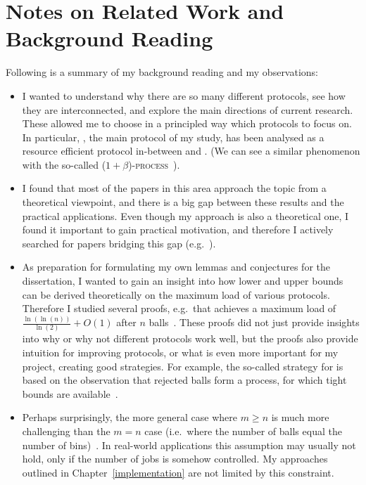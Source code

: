 
\chapter{Notes on Related Work and Background Reading}\label{related-work} 

Following is a summary of my background reading and my observations:


\begin{itemize}
    \item 
    I wanted to understand why there are so many different protocols, see how they are interconnected, and explore the main directions of current research. These allowed me to choose in a principled way which protocols to focus on. In particular, \TwoThinning, the main protocol of my study, has been analysed as a resource efficient protocol in-between \OneChoice and \TwoChoice. (We can see a similar phenomenon with the so-called \textsc{($1+\beta$)-process}~\cite{peres2015oneplusbeta}).
    \item
    I found that most of the papers in this area approach the topic from a theoretical viewpoint, and there is a big gap between these results and the practical applications. Even though my approach is also a theoretical one, I found it important to gain practical motivation, and therefore I actively searched for papers bridging this gap (e.g.~\cite{wang2017twochoicerouting}).
    \item
    As preparation for formulating my own lemmas and conjectures for the dissertation, I wanted to gain an insight into how lower and upper bounds can be derived theoretically on the maximum load of various protocols. Therefore I studied several proofs, e.g.\ that \TwoChoice achieves a maximum load of $\frac{\ln(\ln(n))}{\ln(2)} + O(1)$ after $n$ balls~\cite{azar1999twochoice}. These proofs did not just provide insights into why or why not different protocols work well, but the proofs also provide intuition for improving protocols, or what is even more important for my project, creating good strategies. For example, the so-called \Threshold strategy for \TwoThinning is based on the observation that rejected balls form a \OneChoice process, for which tight bounds are available~\cite{feldheim2021thinning}.
    \item
    Perhaps surprisingly, the more general case where $m\geq n$ is much more challenging than the $m=n$ case (i.e.\ where the number of balls equal the number of bins)~\cite{berenbrink2006heavilyloaded}. In real-world applications this assumption may usually not hold, only if the number of jobs is somehow controlled. My approaches outlined in Chapter~\ref{implementation} are not limited by this constraint.

\end{itemize}
